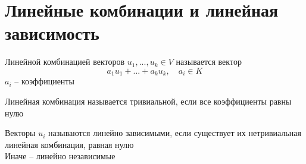 \section{Линейные комбинации и линейная зависимость}

\begin{definition}
	Линейной комбинацией векторов $u_1, ..., u_k \in V$ называется вектор
    $$ a_1u_1 + ... + a_ku_k, \quad a_i \in K $$
    $a_i$ -- коэффициенты
\end{definition}

\begin{definition}
	Линейная комбинация называется тривиальной, если все коэффициенты равны нулю
\end{definition}

\begin{definition}
	Векторы $u_i$ называются линейно зависимыми, если существует их нетривиальная линейная комбинация, равная нулю \\
    Иначе -- линейно независимые
\end{definition}


